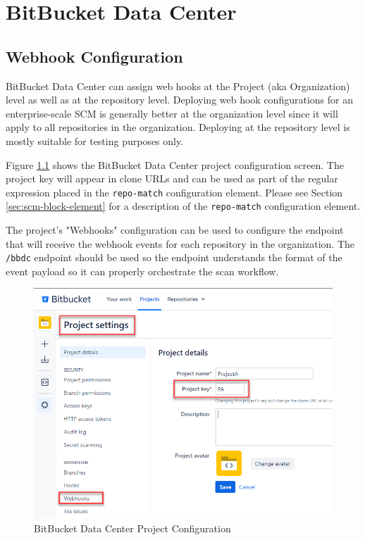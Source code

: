\chapter{BitBucket Data Center}


\section{Webhook Configuration}

BitBucket Data Center can assign web hooks at the Project (aka Organization) level as well as at the
repository level.  Deploying web hook configurations for an enterprise-scale SCM is generally better
at the organization level since it will apply to all repositories in the organization.  Deploying
at the repository level is mostly suitable for testing purposes only.

Figure \ref{fig:bbdc-project-config} shows the BitBucket Data Center project configuration screen.  The
project key will appear in clone URLs and can be used as part of the regular expression 
placed in the \texttt{repo-match} configuration element.  Please see Section \ref{sec:scm-block-element} 
for a description of the \texttt{repo-match} configuration element.

The project's "Webhooks" configuration can be used to configure the \cxoneflow endpoint that will receive
the webhook events for each repository in the organization.  The \texttt{/bbdc} endpoint should be used
so the \cxoneflow endpoint understands the format of the event payload so it can properly orchestrate the
scan workflow. 

\begin{figure}[h]
    \includegraphics[width=\textwidth]{graphics/bbdc-project-config.png}
    \caption{BitBucket Data Center Project Configuration}
    \label{fig:bbdc-project-config}
\end{figure}

